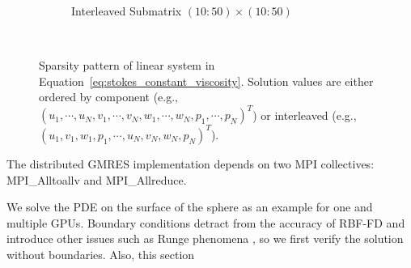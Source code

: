 \begin{figure}
\begin{subfigure}[b]{0.4\textwidth}
		\caption{Interleaved Submatrix $(10:50) \times (10:50)$}
		\label{fig:interleaved_stokes_zoom_dm}
	\end{subfigure} \\
\caption{Sparsity pattern of linear system in Equation~\ref{eq:stokes_constant_viscosity}. Solution values are either ordered by component (e.g., $( u_1, \cdots, u_N, v_1, \cdots, v_N, w_1, \cdots, w_N, p_1, \cdots, p_N)^T$) or interleaved (e.g., $( u_1, v_1, w_1, p_1,\cdots, u_N, v_N, w_N, p_N)^T$). }
\label{fig:interleaved_solution}
\end{figure} 


The distributed GMRES implementation depends on two MPI collectives: MPI\_Alltoallv and MPI\_Allreduce. 



We solve the PDE on the surface of the sphere as an example for one and multiple GPUs. Boundary conditions detract from the accuracy of RBF-FD and introduce other issues such as Runge phenomena \cite{RBFRungePaper}, so we first verify the solution without boundaries. Also, this section 




